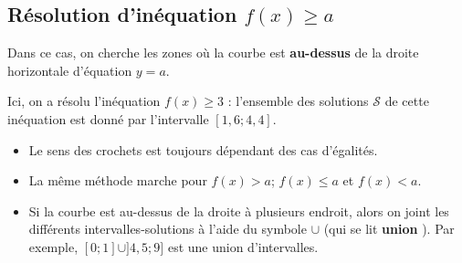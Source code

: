 \documentclass{article}
\begin{document}
\subsection{Résolution d'inéquation $f(x) \geq a$}
Dans ce cas, on cherche les zones où la courbe est \textbf{au-dessus} de la droite horizontale d'équation $y = a$.
\begin{example}
\hfill
\begin{center}
\end{center}
Ici, on a résolu l'inéquation $f(x) \geq 3$ : l'ensemble des solutions $\mathcal{S}$ de cette inéquation est donné par l'intervalle $[1,6;4,4]$.
\end{example}
\begin{tcolorbox}
\begin{remark}
\hfill
\begin{itemize}
\item Le sens des crochets est toujours dépendant des cas d'égalités.
\item La même méthode marche pour $f(x) > a$; $f(x) \leq a$ et $f(x) < a$.
\item Si la courbe est au-dessus de la droite à plusieurs endroit, alors on \og joint \fg les différents intervalles-solutions à l'aide du symbole $\cup$ (qui se lit \textbf{\og union \fg}). Par exemple, $[0;1] \cup ]4,5;9]$ est une union d'intervalles.
\end{itemize}
\end{remark}
\end{tcolorbox}

\newpage
\end{document}
